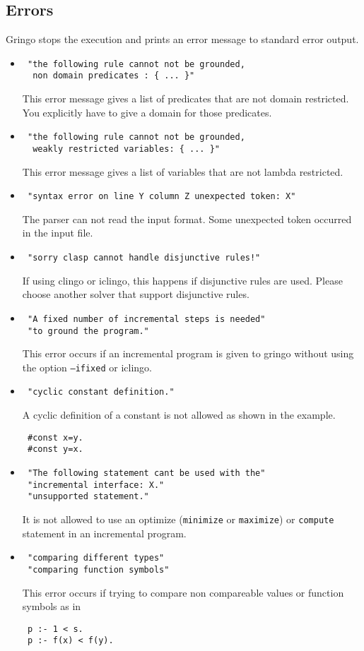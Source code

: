 \documentclass[a4paper,10pt]{article}
\begin{document}
\subsection{Errors}
Gringo stops the execution and prints an error message to standard error output.
\begin{itemize}
 \item 
\begin{verbatim}
 "the following rule cannot not be grounded,
  non domain predicates : { ... }"
\end{verbatim}
This error message gives a list of predicates that are not domain restricted.
You explicitly have to give a domain for those predicates.
 \item 
\begin{verbatim}
 "the following rule cannot not be grounded,
  weakly restricted variables: { ... }"
\end{verbatim}
This error message gives a list of variables that are not lambda restricted. 
\item
\begin{verbatim}
 "syntax error on line Y column Z unexpected token: X"
\end{verbatim}
The parser can not read the input format. Some unexpected token occurred in the input file.
\item
\begin{verbatim}
 "sorry clasp cannot handle disjunctive rules!"
\end{verbatim}
If using clingo or iclingo, this happens if disjunctive rules are used. Please choose another solver that support disjunctive rules.
\item
\begin{verbatim}
 "A fixed number of incremental steps is needed"
 "to ground the program."
\end{verbatim}
This error occurs if an incremental program is given to gringo without using the option \texttt{--ifixed} or iclingo.
\item
\begin{verbatim}
 "cyclic constant definition."
\end{verbatim}
A cyclic definition of a constant is not allowed as shown in the example.
\begin{verbatim}
 #const x=y.
 #const y=x.
\end{verbatim}
\item
\begin{verbatim}
 "The following statement cant be used with the"
 "incremental interface: X."
 "unsupported statement."
\end{verbatim}
It is not allowed to use an optimize (\texttt{minimize} or \texttt{maximize}) or \texttt{compute} statement in an incremental program.
\item
\begin{verbatim}
 "comparing different types"
 "comparing function symbols"
\end{verbatim}
This error occurs if trying to compare non compareable values or function symbols as in
\begin{verbatim}
 p :- 1 < s.
 p :- f(x) < f(y).
\end{verbatim}


\end{itemize}
\end{document}
